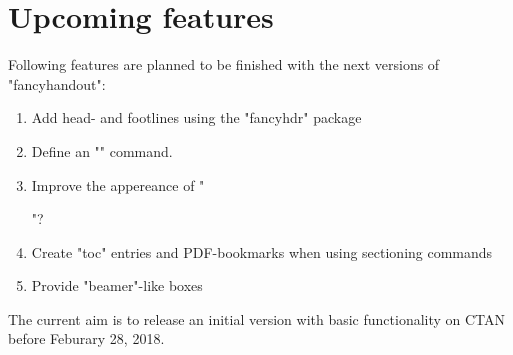 \documentclass[11pt]{ltxdoc}
\begin{document}
	\section{Upcoming features}
	Following features are planned to be finished with the next versions of "fancyhandout":
	\begin{enumerate}
		\item
			Add head- and footlines using the "fancyhdr" package
		
		\item
			Define an "\institute" command.
		
		\item
			Improve the appereance of "\maketitle"?
		
		\item
			Create "toc" entries and PDF-bookmarks when using sectioning commands
		
		\item
			Provide "beamer"-like boxes
	\end{enumerate}
	
	The current aim is to release an initial version with basic functionality on CTAN before Feburary 28, 2018.
\end{document}

